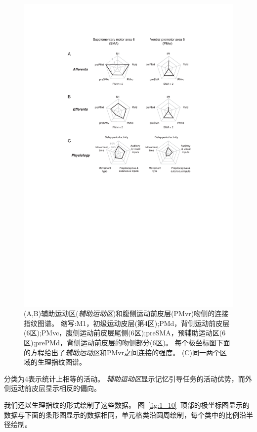\begin{figure}[!htb]
	\centering
	\includegraphics[width=0.8\linewidth]{chap1/1_9}
	\caption{(A,B)辅助运动区(\textit{辅助运动区})和腹侧运动前皮层(PMvr)吻侧的连接指纹图谱。
		缩写:M1，初级运动皮层(第4区);PMd，背侧运动前皮层(6区);PMvc，腹侧运动前皮层尾侧(6区);preSMA，预辅助运动区(6区);prePMd，背侧运动前皮层的吻侧部分(6区)。
		每个极坐标图下面的方程给出了\textit{辅助运动区}和PMvr之间连接的强度。
		(C)同一两个区域的生理指纹图谱\cite{passingham2002anatomical}。	\label{fig:1_9}}
\end{figure}


\par
分类为4表示统计上相等的活动。
\textit{辅助运动区}显示记忆引导任务的活动优势，而外侧运动前皮层显示相反的偏向。
\par
我们还以生理指纹的形式绘制了这些数据。
图~\ref{fig:1_10}~顶部的极坐标图显示的数据与下面的条形图显示的数据相同，单元格类沿圆周绘制，每个类中的比例沿半径绘制。


